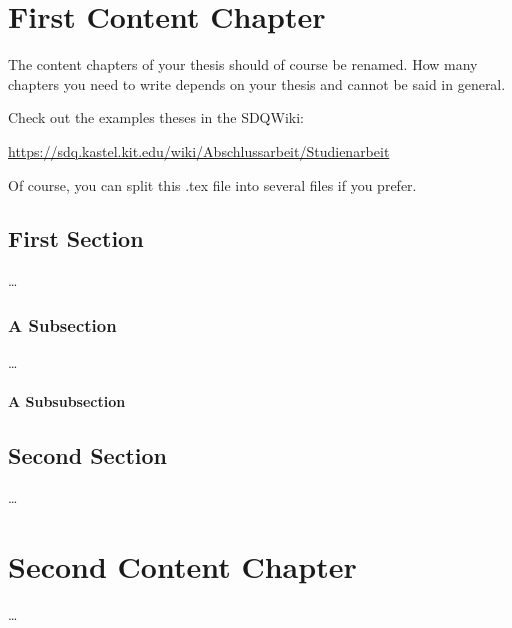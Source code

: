 
\chapter{First Content Chapter}
\label{ch:FirstContent}

The content chapters of your thesis should of course be renamed. How many
chapters you need to write depends on your thesis and cannot be said in general.

Check out the examples theses in the SDQWiki:

\url{https://sdq.kastel.kit.edu/wiki/Abschlussarbeit/Studienarbeit}

Of course, you can split this .tex file into several files if you prefer. 


\section{First Section}
\label{sec:FirstContent:FirstSection}

\dots

\subsection{A Subsection}
\label{sec:FirstContent:FirstSubSection}

\dots

\subsubsection{A Subsubsection}

\section{Second Section}
\label{sec:FirstContent:SecondSection}

\dots


\chapter{Second Content Chapter}
\label{ch:SecondContent}

\dots


